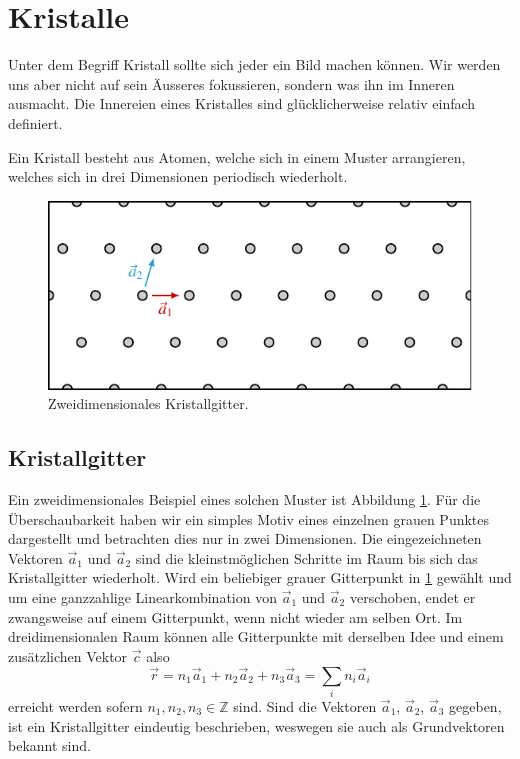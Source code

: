 \section{Kristalle}
Unter dem Begriff Kristall sollte sich jeder ein Bild machen können.
Wir werden uns aber nicht auf sein Äusseres fokussieren, sondern was ihn im Inneren ausmacht.
Die Innereien eines Kristalles sind glücklicherweise relativ einfach definiert.
\begin{definition}[Kristall]
    Ein Kristall besteht aus Atomen, welche sich in einem Muster arrangieren, welches sich in drei Dimensionen periodisch wiederholt.
\end{definition}

\begin{figure}
    \centering
    \includegraphics[]{papers/punktgruppen/figures/lattice}
    \caption{
        Zweidimensionales Kristallgitter.
        \label{fig:punktgruppen:lattice}
    }
\end{figure}
\subsection{Kristallgitter}
Ein zweidimensionales Beispiel eines solchen Muster ist Abbildung \ref{fig:punktgruppen:lattice}.
Für die Überschaubarkeit haben wir ein simples Motiv eines einzelnen grauen Punktes dargestellt und betrachten dies nur in zwei Dimensionen.
Die eingezeichneten Vektoren \(\vec{a}_1\) und \(\vec{a}_2\) sind die kleinstmöglichen Schritte im Raum bis sich das Kristallgitter wiederholt.
Wird ein beliebiger grauer Gitterpunkt in \ref{fig:punktgruppen:lattice} gewählt und um eine ganzzahlige Linearkombination von \(\vec{a}_1\) und \(\vec{a}_2\) verschoben, endet er zwangsweise auf einem Gitterpunkt, wenn nicht wieder am selben Ort.
Im dreidimensionalen Raum können alle Gitterpunkte mit derselben Idee und einem zusätzlichen Vektor \(\vec{c}\) also
\[
	\vec{r} = n_1 \vec{a}_1 + n_2 \vec{a}_2 + n_3 \vec{a}_3 = \sum_i n_i \vec{a}_i
\]
erreicht werden sofern \(n_1,n_2,n_3 \in \mathbb{Z}\) sind.
Sind die Vektoren  \(\vec{a}_1\), \(\vec{a}_2\), \(\vec{a}_3\) gegeben, ist ein Kristallgitter eindeutig beschrieben, weswegen sie auch als Grundvektoren bekannt sind.

